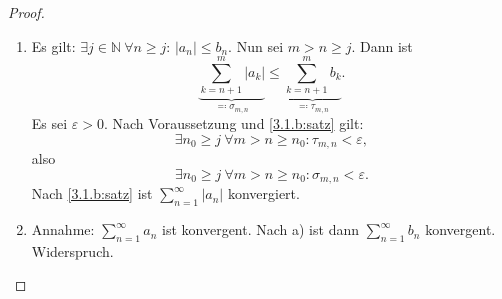 \documentclass[12pt]{extreport} %
\newcommand{\N}{\mathbb{N}}
\theoremstyle{named}
\theoremstyle{itshape}
\theoremstyle{normal}
\begin{document}
\begin{proof} ~\
	\begin{enumerate}
		\item Es gilt: $\exists j \in \N~ \forall n \geq j$: $|a_{n}| \leq b_{n}$. Nun sei $m > n \geq j$. Dann ist
			$$ \underbrace{\sum_{k=n+1}^{m}|a_{k}|}_{\eqqcolon \sigma_{m, n}} \leq \underbrace{\sum_{k=n+1}^{m} b_{k}}_{\eqqcolon \tau_{m,n}}. $$
			Es sei $\varepsilon > 0$. Nach Voraussetzung und \ref{3.1.b:satz} gilt: 
			$$
			\exists n_{0} \geq j ~ \forall m > n \geq n_{0}: \tau_{m,n} < \varepsilon,
			$$
			also
			$$
			\exists n_{0} \geq j ~ \forall m > n \geq n_{0}: \sigma_{m,n} < \varepsilon.
			$$
			Nach \ref{3.1.b:satz} ist $\sum_{n=1}^{\infty} |a_{n}|$ konvergiert.
		\item Annahme: $\sum_{n=1}^{\infty} a_{n}$ ist konvergent. Nach a) ist dann $\sum_{n=1}^{\infty} b_{n}$ konvergent. Widerspruch.
	\end{enumerate}	
\end{proof}
\end{document}
